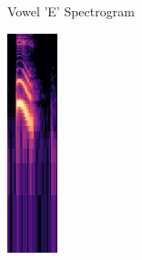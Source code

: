 \begin{figure}[htbp]
\begin{subfigure}[b]{0.19\textwidth}
        \caption{Vowel 'E' Spectrogram}
        \label{fig:vowel_e_spec}
    \end{subfigure}
    \hfill
    \begin{subfigure}[b]{0.19\textwidth}
        \includegraphics[width=\textwidth]{res/images/model/I.png}

\end{subfigure}
\end{figure}
